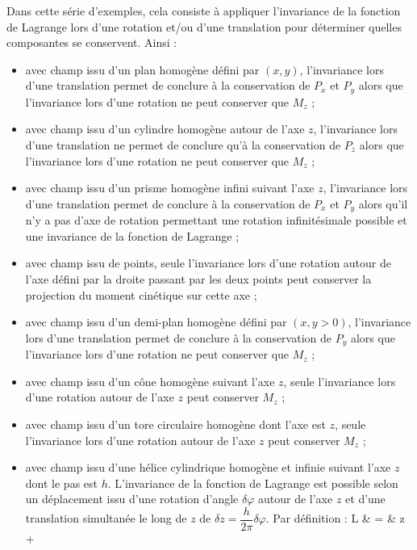 Dans cette s\'erie d'exemples, cela consiste \`a appliquer l'invariance de la fonction de Lagrange lors d'une rotation et/ou d'une translation pour d\'eterminer quelles composantes se conservent. Ainsi :
\begin{itemize}
	\item[a)] avec champ issu d'un plan homog\`ene d\'efini par $(x,y)$, l'invariance lors d'une translation permet de conclure \`a la conservation de $P_{x}$ et $P_{y}$ alors que l'invariance lors d'une rotation ne peut conserver que $M_{z}$ ;
	\item[b)] avec champ issu d'un cylindre homog\`ene autour de l'axe $z$, l'invariance lors d'une translation ne permet de conclure qu'\`a la conservation de $P_{z}$ alors que l'invariance lors d'une rotation ne peut conserver que $M_{z}$ ;
	\item[c)] avec champ issu d'un prisme homog\`ene infini suivant l'axe $z$, l'invariance lors d'une translation permet de conclure \`a la conservation de $P_{x}$ et $P_{y}$ alors qu'il n'y a pas d'axe de rotation permettant une rotation infinit\'esimale possible et une invariance de la fonction de Lagrange ;
	\item[d)] avec champ issu de points, seule l'invariance lors d'une rotation autour de l'axe d\'efini par la droite passant par les deux points peut conserver la projection du moment cin\'etique sur cette axe ;
	\item[e)] avec champ issu d'un demi-plan homog\`ene d\'efini par $(x,y > 0)$, l'invariance lors d'une translation permet de conclure \`a la conservation de $P_{y}$ alors que l'invariance lors d'une rotation ne peut conserver que $M_{z}$ ;
	\item[f)] avec champ issu d'un c\^one homog\`ene suivant l'axe $z$, seule l'invariance lors d'une rotation autour de l'axe $z$ peut conserver $M_{z}$ ;
	\item[g)] avec champ issu d'un tore circulaire homog\`ene dont l'axe est $z$, seule l'invariance lors d'une rotation autour de l'axe $z$ peut conserver $M_{z}$ ;
	\item[h)] avec champ issu d'une h\'elice cylindrique homog\`ene et infinie suivant l'axe $z$ dont le pas est $h$. L'invariance de la fonction de Lagrange est possible selon un d\'eplacement issu d'une rotation d'angle $\delta\varphi$ autour de l'axe $z$ et d'une translation simultan\'ee le long de $z$ de $\delta z = \dfrac{h}{2\pi}\delta\varphi$. Par d\'efinition :
		\bea
			\delta L & = & \delta z + \delta\varphi \nonumber \\

\end{itemize}
